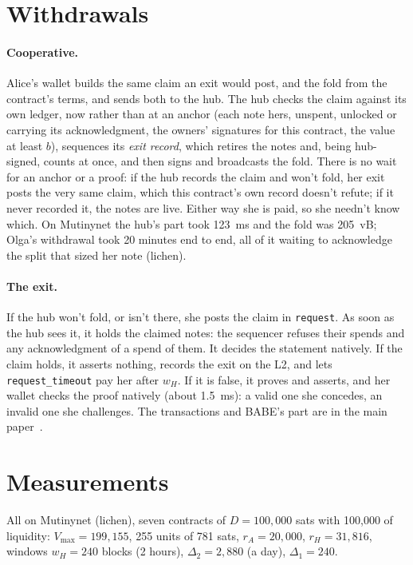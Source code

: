 \documentclass[11pt]{article}
\newcommand{\vmax}{V_{\max}}
\newcommand{\tx}[1]{\texttt{#1}}
\begin{document}
\section{Withdrawals}
\label{sec:withdraw}

\paragraph{Cooperative.} Alice's wallet builds the same claim an exit
would post, and the fold from the contract's terms, and sends both to
the hub. The hub checks the claim against its own ledger, now rather
than at an anchor (each note hers, unspent, unlocked or carrying its
acknowledgment, the owners' signatures for this contract, the value at
least $b$), sequences its \emph{exit record}, which retires the notes
and, being hub-signed, counts at once, and then signs and broadcasts the
fold. There is no wait for an anchor or a proof: if the hub records the
claim and won't fold, her exit posts the very same claim, which this
contract's own record doesn't refute; if it never recorded it, the notes
are live. Either way she is paid, so she needn't know which. On
Mutinynet the hub's part took 123~ms and the fold was 205~vB; Olga's
withdrawal took 20 minutes end to end, all of it waiting to acknowledge
the split that sized her note (lichen).

\paragraph{The exit.} If the hub won't fold, or isn't there, she posts
the claim in \tx{request}. As soon as the hub sees it, it holds the
claimed notes: the sequencer refuses their spends and any acknowledgment
of a spend of them. It decides the statement natively. If the claim
holds, it asserts nothing, records the exit on the L2, and lets
\tx{request\_timeout} pay her after $w_H$. If it is false, it proves and
asserts, and her wallet checks the proof natively (about 1.5~ms): a
valid one she concedes, an invalid one she challenges. The transactions
and BABE's part are in the main paper~\cite[App.~A]{lichen}.

\section{Measurements}
\label{sec:measured}

All on Mutinynet (lichen), seven contracts of $D = 100{,}000$ sats with
100,000 of liquidity: $\vmax = 199{,}155$, 255 units of 781 sats, $r_A
= 20{,}000$, $r_H = 31{,}816$, windows $w_H = 240$ blocks (2 hours),
$\Delta_2 = 2{,}880$ (a day), $\Delta_1 = 240$.
\end{document}
